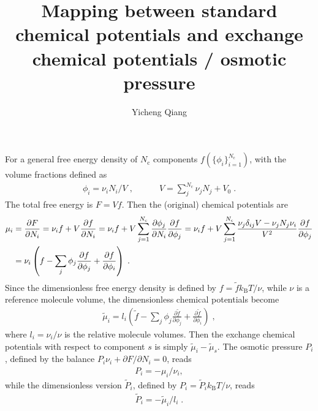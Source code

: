 \documentclass[reprint,onecolumn,groupedaddress,amsmath,amssymb]{revtex4-2}
\begin{document}
\title{Mapping between standard chemical potentials and exchange chemical potentials / osmotic pressure}

\author{Yicheng Qiang}

\maketitle

For a general free energy density of $N_\mathrm{c}$ components $f(\{\phi_i\}_{i=1}^{N_\mathrm{c}})$, with the volume fractions defined as
\begin{align}
    \phi_i = \nu_i  N_i / V\;, \quad \quad \quad V = \sum_j^{N_\mathrm{c}} \nu_j N_j + V_0 \;.
\end{align}
The total free energy is $F = V f$.
Then the (original) chemical potentials are
\begin{align}
    \mu_i 
    &= \frac{\partial F}{\partial N_i}
    = \nu_i f + V \frac{\partial f}{\partial N_i}
    = \nu_i f + V \sum_{j=1}^{N_\mathrm{c}} \frac{\partial \phi_j}{\partial N_i} \frac{\partial f}{\partial \phi_j}
    = \nu_i f + V \sum_{j=1}^{N_\mathrm{c}} \frac{\nu_j \delta_{ij} V - \nu_j N_j \nu_i}{V^2} \frac{\partial f}{\partial \phi_j} \notag \\
    &= \nu_i \left( f - \sum_j \phi_j \frac{\partial f}{\partial \phi_j} + \frac{\partial f}{\partial \phi_i} \right) \;.
\end{align}
Since the dimensionless free energy density is defined by $f = \tilde{f} k_\mathrm{B} T / \nu$, while $\nu$ is a reference molecule volume, the dimensionless chemical potentials become
\begin{align}
    \tilde{\mu}_i = l_i \left(\tilde{f} - \sum_j \phi_j \frac{\partial \tilde{f}}{\partial \phi_j} + \frac{\partial \tilde{f}}{\partial \phi_i} \right) \;,
\end{align} 
where $l_i = \nu_i / \nu$ is the relative molecule volumes.
Then the exchange chemical potentials with respect to component $s$ is simply $\tilde{\mu}_i - \tilde{\mu}_s$.
The osmotic pressure $P_i$, defined by the balance $P_i \nu_i + \partial F/\partial N_i = 0$, reads
\begin{align}
    P_i = - \mu_i / \nu_i, 
\end{align} 
while the dimensionless version $\tilde{P}_i$, defined by $P_i = \tilde{P}_i k_\mathrm{B} T / \nu$, reads
\begin{align}
    \tilde{P}_i = - \tilde{\mu}_i / l_i \;.
\end{align}
\end{document}
